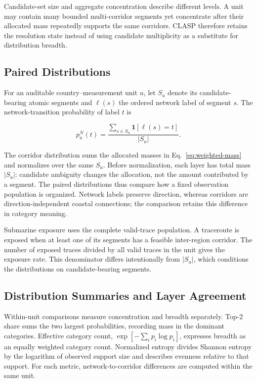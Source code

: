 Candidate-set size and aggregate concentration describe different levels. A
unit may contain many bounded multi-corridor segments yet concentrate after
their allocated mass repeatedly supports the same corridors. CLASP therefore
retains the resolution state instead of using candidate multiplicity as a
substitute for distribution breadth.

\subsection{Paired Distributions}
\label{sec:framework_distribution_analysis}

For an auditable country--measurement unit \(u\), let \(S_u\) denote its
candidate-bearing atomic segments and \(\ell(s)\) the ordered network label of
segment \(s\). The network-transition probability of label \(t\) is

\begin{equation}
  p_u^{N}(t)=
  \frac{\sum_{s\in S_u}\mathbf{1}[\ell(s)=t]}
       {|S_u|}.
  \label{eq:network-distribution}
\end{equation}

The corridor distribution sums the allocated masses in
Eq.~\eqref{eq:weighted-mass} and normalizes over the same \(S_u\).
Before normalization, each layer has total mass \(|S_u|\): candidate
ambiguity changes the allocation, not the amount contributed by a segment.
The paired distributions thus compare how a fixed observation population
is organized. Network labels preserve direction, whereas corridors are
direction-independent coastal connections; the comparison retains this
difference in category meaning.

Submarine exposure uses the complete valid-trace population. A traceroute is
exposed when at least one of its segments has a feasible inter-region corridor.
The number of exposed traces divided by all valid traces in the unit gives the
exposure rate. This denominator differs intentionally from \(|S_u|\), which
conditions the distributions on candidate-bearing segments.

\subsection{Distribution Summaries and Layer Agreement}
\label{sec:framework_metrics}

Within-unit comparisons measure concentration and breadth separately.
Top-2 share sums the two largest probabilities, recording mass in the
dominant categories. Effective category count,
\(\exp[-\sum_i p_i\log p_i]\), expresses breadth as an equally weighted
category count. Normalized entropy divides Shannon entropy by the logarithm
of observed support size and describes evenness relative to that support.
For each metric, network-to-corridor differences are computed within
the same unit.

